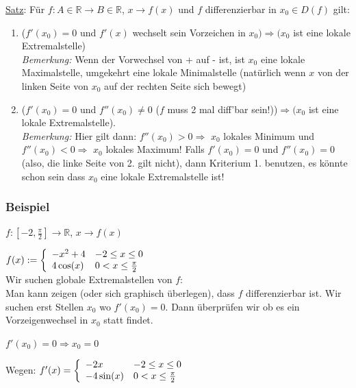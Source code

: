 \documentclass[11pt]{article} %
\begin{document}
\underline{Satz}: Für $f: A \in \mathbb{R} \rightarrow B \in \mathbb{R}$, $x \rightarrow f(x)$ und $f$ differenzierbar in $x_0\in D(f)$ gilt:
\begin{enumerate}
\item ($f'(x_0) = 0 $ und $f'(x)$ wechselt sein Vorzeichen in $x_0) \Rightarrow (x_0$ ist eine lokale Extremalstelle)
\\\emph{Bemerkung:} Wenn der Vorwechsel von + auf - ist, ist $x_0$ eine lokale Maximalstelle, umgekehrt eine lokale Minimalstelle (natürlich wenn $x$ von der linken Seite von $x_0$ auf der rechten Seite sich bewegt)
\item ($f'(x_0)=0$ und $f''(x_0) \neq 0$ ($f$ muss 2 mal diff'bar sein!))$\Rightarrow (x_0$ ist eine lokale Extremalstelle). \\\emph{Bemerkung:} Hier gilt dann: $f''(x_0) >0 \Rightarrow$ $x_0$ lokales Minimum und $f''(x_0) < 0 \Rightarrow$ $x_0$ lokales Maximum! Falls $f'(x_0) = 0$ und $f''(x_0) = 0$ (also, die linke Seite von 2. gilt nicht), dann Kriterium 1. benutzen, es könnte schon sein dass $x_0$ eine lokale Extremalstelle ist!

\end{enumerate}

 \subsubsection{Beispiel}

$f: [-2,\frac{\pi}{2}] \rightarrow \mathbb{R}$, $x\rightarrow f(x)$

$f(x) := \left \{ 
\begin{array}{l  l}
	-x^2+4 & -2\leq x\leq0\\
	4\cos(x) & 0 <x \leq \frac{\pi}{2}\\
	\end{array} \right.$ \\


Wir suchen globale Extremalstellen von $f$:\\

Man kann zeigen (oder sich graphisch überlegen), dass $f$ differenzierbar ist. Wir suchen erst Stellen $x_0$ wo $f'(x_0) = 0$. Dann überprüfen wir ob es ein Vorzeigenwechsel in $x_0$ statt findet.

$f'(x_0) = 0 \Rightarrow x_0 = 0$

Wegen: $ f'(x) = \left \{ 
\begin{array}{l  l}
	-2x & -2\leq x\leq0\\
	-4\sin(x) & 0 <x \leq \frac{\pi}{2}\\
	\end{array} \right.$ \\
\end{document}
